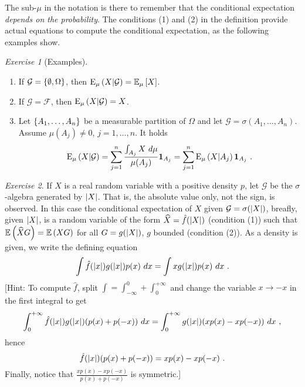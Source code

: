 \documentclass[12pt,a4paper]{amsart}
\newcommand{\one}{\bm 1}
\theoremstyle{plain}%
\theoremstyle{definition}
\theoremstyle{remark}
\newtheorem{exercise}{Exercise}
\begin{document}
The sub-$\mu$ in the notation is there to remember that the conditional expectation \emph{depends on the probability}. The conditions (1) and (2) in the definition provide actual equations to compute the conditional expectation, as the following examples show.

\begin{exercise}[Examples]
  \begin{enumerate}
  \item If $\mathcal G = \left\{\emptyset,\Omega\right\}$, then $\operatorname{E}_{\mu}\left(X \middle| \mathcal G\right) = \operatorname{\mathbb E}_{\mu}\left[X\right]$.
  \item If $\mathcal G = \mathcal F$, then $\operatorname{E}_{\mu}\left(X \middle| \mathcal G\right) = X$.
  \item Let $\left\{A_1, \dots, A_n\right\}$ be a measurable partition of $\Omega$ and let $\mathcal G = \sigma(A_1, \dots, A_n)$. Assume $\mu(A_j) \ne 0$, $j=1,\dots,n$. It holds
    \begin{equation*}
      \condexpat \mu X {\mathcal G} = \sum_{j=1}^n \frac{\int_{A_j} X \ d\mu}{\mu(A_j)} \one_{A_j} = \sum_{j=1}^n \condexpat \mu X {A_j} \one_{A_j} \ .
    \end{equation*}
\end{enumerate}
\end{exercise}

\begin{exercise}
If $X$ is a real random variable with a positive density $p$, let $\mathcal G$ be the $\sigma$-algebra generated by $\left\vert X\right\vert$. That is, the absolute value only, not the sign, is observed. In this case the conditional expectation of $X$ given $\mathcal G = \sigma(\left\vert X\right\vert)$, breafly, given $\left\vert X\right\vert$, is a random variable of the form $\widehat X = \hat f(\left\vert X\right\vert)$ (condition (1)) such that $\operatorname{\mathbb E}\left(\widehat X G\right) = \operatorname{\mathbb E}\left(XG\right)$ for all $G = g(\left\vert X\right\vert)$, $g$ bounded (condition (2)). As a density is given, we write the defining equation
\begin{equation*}
  \int \hat f(\left\vert x\right\vert) g(\left\vert x\right\vert) p(x) \ dx = \int x g(\left\vert x\right\vert) p(x) \ dx \ . 
\end{equation*}
[Hint: To compute $\hat f$, split $\int = \int_{-\infty}^0+\int_0^{+\infty}$ and change the variable $x \to -x$ in the first integral to get
\begin{equation*}
   \int_0^{+\infty} \hat f(\aval x) g(\aval x) (p(x)+p(-x)) \ dx = \int_0^{+\infty}  g(\aval x) (xp(x)-xp(-x)) \ dx \ , 
 \end{equation*}
hence
\begin{equation*}
  \hat f(\left\vert x\right\vert) (p(x)+p(-x)) = xp(x)-xp(-x) \ . 
 \end{equation*}
Finally, notice that $\frac{xp(x)-xp(-x)}{p(x)+p(-x)}$ is symmetric.]
\end{exercise}
\end{document}
